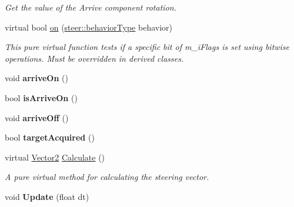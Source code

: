 \begin{DoxyCompactItemize}
\begin{DoxyCompactList}\small\item\em Get the value of the Arrive component rotation. \end{DoxyCompactList}\item 
virtual bool \hyperlink{classsteer_1_1_arrive_component_ac904acaeee6865089e3255cf8d7390ce}{on} (\hyperlink{namespacesteer_afe6e72f8f8088962727051501181acbe}{steer\-::behavior\-Type} behavior)
\begin{DoxyCompactList}\small\item\em This pure virtual function tests if a specific bit of m\-\_\-i\-Flags is set using bitwise operations. Must be overridden in derived classes. \end{DoxyCompactList}\item 
\hypertarget{classsteer_1_1_arrive_component_aa9932b69649263979a3c3c6f6cc0e9ca}{void {\bfseries arrive\-On} ()}\label{classsteer_1_1_arrive_component_aa9932b69649263979a3c3c6f6cc0e9ca}

\item 
\hypertarget{classsteer_1_1_arrive_component_a68af4a92285c2fc0e4701592425f0ff3}{bool {\bfseries is\-Arrive\-On} ()}\label{classsteer_1_1_arrive_component_a68af4a92285c2fc0e4701592425f0ff3}

\item 
\hypertarget{classsteer_1_1_arrive_component_a0980ff65929a80b305076467fd99faa5}{void {\bfseries arrive\-Off} ()}\label{classsteer_1_1_arrive_component_a0980ff65929a80b305076467fd99faa5}

\item 
\hypertarget{classsteer_1_1_arrive_component_a8ec6d52fe9f21b59aa2388b04269620b}{bool {\bfseries target\-Acquired} ()}\label{classsteer_1_1_arrive_component_a8ec6d52fe9f21b59aa2388b04269620b}

\item 
\hypertarget{classsteer_1_1_arrive_component_ad71d15383edb2b3b40ca9bc8552e31e5}{virtual \hyperlink{structsteer_1_1_vector2}{Vector2} \hyperlink{classsteer_1_1_arrive_component_ad71d15383edb2b3b40ca9bc8552e31e5}{Calculate} ()}\label{classsteer_1_1_arrive_component_ad71d15383edb2b3b40ca9bc8552e31e5}

\begin{DoxyCompactList}\small\item\em A pure virtual method for calculating the steering vector. \end{DoxyCompactList}\item 
\hypertarget{classsteer_1_1_arrive_component_a8ef75e32bd3c2a414e21483eabd12d89}{void {\bfseries Update} (float dt)}\label{classsteer_1_1_arrive_component_a8ef75e32bd3c2a414e21483eabd12d89}

\end{DoxyCompactItemize}
